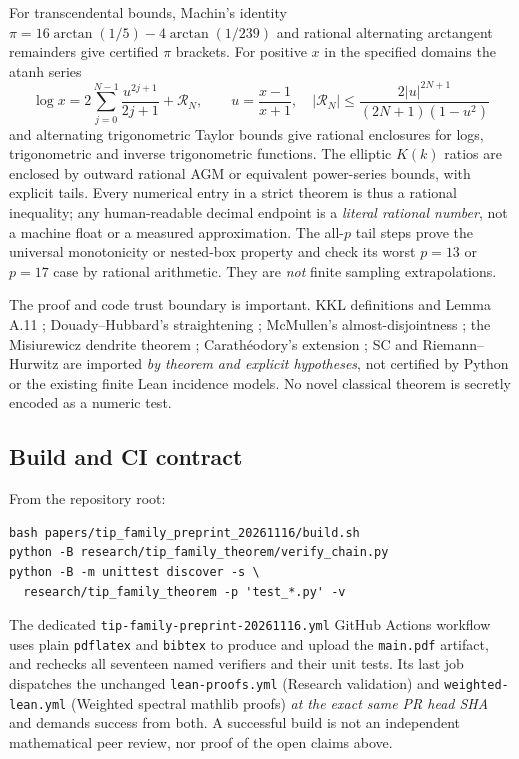 For transcendental
bounds, Machin's
identity
$\pi=16\arctan(1/5)
-4\arctan(1/239)$
and rational
alternating arctangent
remainders give
certified $\pi$
brackets.
For positive
$x$ in the
specified domains
the atanh series
\[
 \log x=2\sum_{j=0}^{N-1}
 \frac{u^{2j+1}}{2j+1}
 +\mathcal{R}_N,\qquad
 u=\frac{x-1}{x+1},\quad
 |\mathcal{R}_N|\le
 \frac{2|u|^{2N+1}}
 {(2N+1)(1-u^2)}
\]
and alternating
trigonometric
Taylor bounds
give rational
enclosures for
logs, trigonometric
and inverse
trigonometric
functions.
The elliptic
$K(k)$ ratios
are enclosed by
outward rational
AGM or equivalent
power-series
bounds, with
explicit tails.
Every numerical
entry in a
strict theorem
is thus a
rational
inequality;
any human-readable
decimal endpoint
is a \emph{literal
rational number},
not a machine
float or a
measured approximation.
The all-$p$
tail steps
prove the
universal
monotonicity
or nested-box
property and
check its
worst $p=13$
or $p=17$
case by
rational
arithmetic.
They are
\emph{not}
finite sampling
extrapolations.

The proof
and code
trust boundary
is important.
KKL definitions
and Lemma A.11
\cite{KKL2026};
Douady--Hubbard's
straightening
\cite{DH1985};
McMullen's
almost-disjointness
\cite{McMullen1994};
the Misiurewicz
dendrite theorem
\cite{LyubichNotes};
Carath\'eodory's
extension
\cite{Caratheodory1913};
SC and
Riemann--Hurwitz
\cite{AhlforsInvariants,Forster1981}
are imported
\emph{by theorem
and explicit
hypotheses},
not certified
by Python or
the existing
finite Lean
incidence
models.
No novel
classical
theorem is
secretly
encoded as
a numeric
test.

\subsection{Build and CI contract}
From the
repository root:
\begin{verbatim}
bash papers/tip_family_preprint_20261116/build.sh
python -B research/tip_family_theorem/verify_chain.py
python -B -m unittest discover -s \
  research/tip_family_theorem -p 'test_*.py' -v
\end{verbatim}
The dedicated
\texttt{tip-family-preprint-20261116.yml}
GitHub Actions
workflow uses
plain
\texttt{pdflatex}
and \texttt{bibtex}
to produce and
upload the
\texttt{main.pdf}
artifact, and
rechecks all
seventeen named
verifiers and
their unit
tests.  Its
last job
dispatches the
unchanged
\texttt{lean-proofs.yml}
(Research validation)
and
\texttt{weighted-lean.yml}
(Weighted spectral
mathlib proofs)
\emph{at the
exact same
PR head SHA}
and demands
success from
both.  A
successful
build is not
an independent
mathematical
peer review,
nor proof of
the open
claims above.
